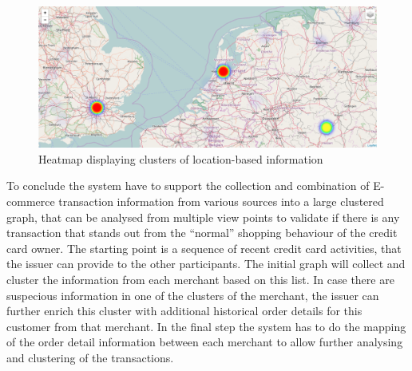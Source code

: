 \begin{figure}[H]
  \centering
  \includegraphics[width=0.9\columnwidth]{images/Heatmap.png}
  \caption{Heatmap displaying clusters of location-based information}
\label{fig:images_map_heatmap}
\end{figure}

To conclude the system have to support the collection and combination of \gls{E-commerce} transaction information from various sources into a large clustered graph, that can be analysed from multiple view points to validate if there is any transaction that stands out from the ``normal'' shopping behaviour of the credit card owner. The starting point is a sequence of recent credit card activities, that the issuer can provide to the other participants. The initial graph will collect and cluster the information from each merchant based on this list. In case there are suspecious information in one of the clusters of the merchant, the issuer can further enrich this cluster with additional historical order details for this customer from that merchant. In the final step the system has to do the mapping of the order detail information between each merchant to allow further analysing and clustering of the transactions.

